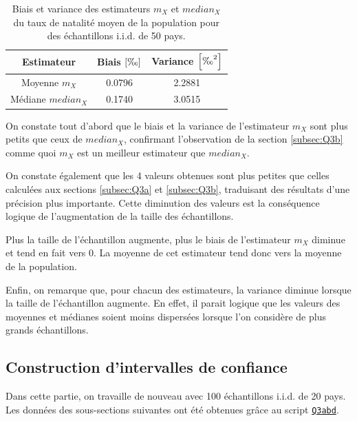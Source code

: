 \documentclass[a4paper, 12pt]{article}
\begin{document}
	\begin{table}[!ht]
	    \centering
	    \begin{tabular}{|c|c|c|}
	        \hline
	        \textbf{Estimateur} & \textbf{Biais} \(\left [\text{\textperthousand} \right ]\) & \textbf{Variance} \(\left [\text{\textperthousand}^2 \right ]\)\\ \hline
	        \hline
	        Moyenne \(m_X\) & \num{0.0796} & \num{2.2881}\\ \hline
	        Médiane \(median_X\) & \num{0.1740} & \num{3.0515}\\ \hline
	    \end{tabular}
	    \caption{Biais et variance des estimateurs \(m_X\) et \(median_X\) du taux de natalité moyen de la population pour des échantillons i.i.d. de 50 pays.}
	    \label{tab:Q3c}
	\end{table}
	
	On constate tout d'abord que le biais et la variance de l'estimateur \(m_X\) sont plus petits que ceux de \(median_X\), confirmant l'observation de la section \ref{subsec:Q3b} comme quoi \(m_X\) est un meilleur estimateur que \(median_X\).\par
	
	On constate également que les \num{4} valeurs obtenues sont plus petites que celles calculées aux sections \ref{subsec:Q3a} et \ref{subsec:Q3b}, traduisant des résultats d'une précision plus importante. Cette diminution des valeurs est la conséquence logique de l'augmentation de la taille des échantillons.\par
	
	Plus la taille de l'échantillon augmente, plus le biais de l'estimateur \(m_X\) diminue et tend en fait vers \(0\). La moyenne de cet estimateur tend donc vers la moyenne de la population.\par
	
	Enfin, on remarque que, pour chacun des estimateurs, la variance diminue lorsque la taille de l'échantillon augmente. En effet, il parait logique que les valeurs des moyennes et médianes soient moins dispersées lorsque l'on considère de plus grands échantillons.
	
	\subsection{Construction d'intervalles de confiance}
	Dans cette partie, on travaille de nouveau avec 100 échantillons i.i.d. de 20 pays. Les données des sous-sections suivantes ont été obtenues grâce au script \hyperref[subsec:code-Q3]{\texttt{Q3abd}}.\par
	
\end{document}

